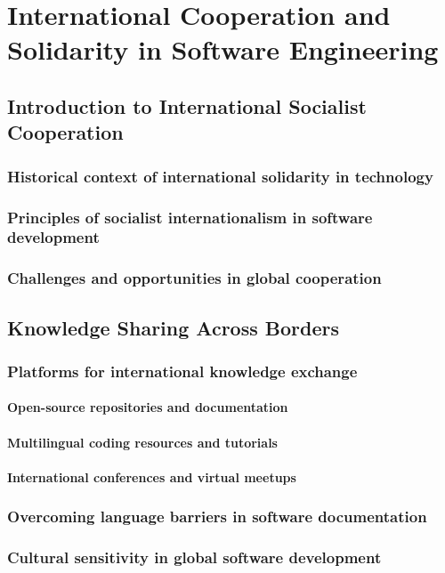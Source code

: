 \chapter{International Cooperation and Solidarity in Software Engineering}

\section{Introduction to International Socialist Cooperation}
\subsection{Historical context of international solidarity in technology}
\subsection{Principles of socialist internationalism in software development}
\subsection{Challenges and opportunities in global cooperation}

\newpage

\section{Knowledge Sharing Across Borders}
\subsection{Platforms for international knowledge exchange}
\subsubsection{Open-source repositories and documentation}
\subsubsection{Multilingual coding resources and tutorials}
\subsubsection{International conferences and virtual meetups}
\subsection{Overcoming language barriers in software documentation}
\subsection{Cultural sensitivity in global software development}

